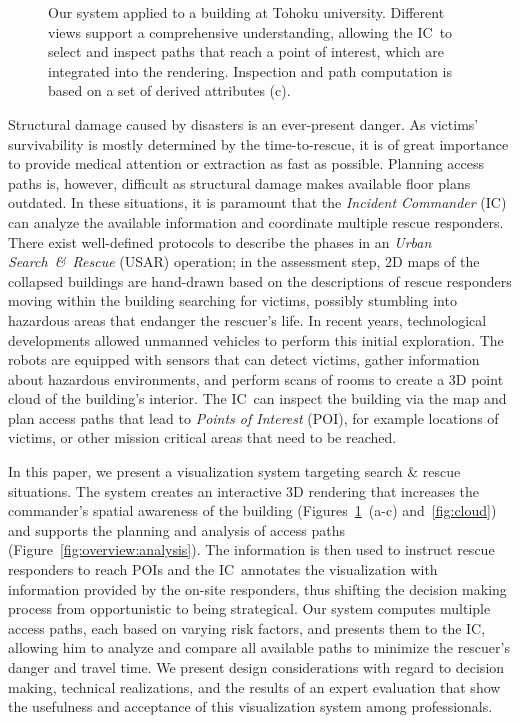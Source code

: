 \documentclass[conference,10pt,letter]{IEEEtran}
\def\IC{IC}
\begin{document}
\begin{figure}
  \caption{Our system applied to a building at Tohoku university. Different views support a comprehensive understanding, allowing the \IC\ to select and inspect paths that reach a point of interest, which are integrated into the rendering. Inspection and path computation is based on a set of derived attributes (c).}
  \label{fig:teaser}
\end{figure}

Structural damage caused by disasters is an ever-present danger. As victims' survivability is mostly determined by the time-to-rescue, it is of great importance to provide medical attention or extraction as fast as possible. Planning access paths is, however, difficult as structural damage makes available floor plans outdated. In these situations, it is paramount that the \emph{Incident Commander} (IC) can analyze the available information and coordinate multiple rescue responders. There exist well-defined protocols to describe the phases in an \emph{Urban Search~\&~Rescue} (USAR) operation; in the assessment step, 2D maps of the collapsed buildings are hand-drawn based on the descriptions of rescue responders moving within the building searching for victims, possibly stumbling into hazardous areas that endanger the rescuer's life. In recent years, technological developments allowed unmanned vehicles to perform this initial exploration. The robots are equipped with sensors that can detect victims, gather information about hazardous environments, and perform scans of rooms to create a 3D point cloud of the building's interior. The \IC\ can inspect the building via the map and plan access paths that lead to \emph{Points of Interest} (POI), for example locations of victims, or other mission critical areas that need to be reached.

In this paper, we present a visualization system targeting search \& rescue situations. The system creates an interactive 3D rendering that increases the commander's spatial awareness of the building (Figures~\ref{fig:teaser}~(a-c) and~\ref{fig:cloud}) and supports the planning and analysis of access paths (Figure~\ref{fig:overview:analysis}). The information is then used to instruct rescue responders to reach POIs and the \IC\ annotates the visualization with information provided by the on-site responders, thus shifting the decision making process from opportunistic to being strategical. Our system computes multiple access paths, each based on varying risk factors, and presents them to the \IC , allowing him to analyze and compare all available paths to minimize the rescuer's danger and travel time. We present design considerations with regard to decision making, technical realizations, and the results of an expert evaluation that show the usefulness and acceptance of this visualization system among professionals.
\end{document}
